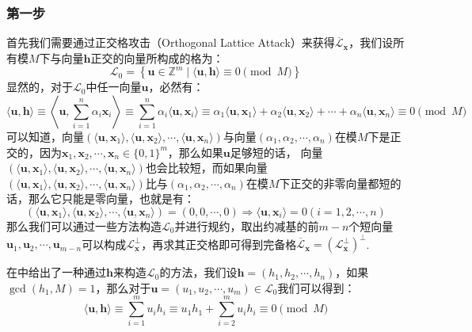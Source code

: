 \documentclass{book}
\numberwithin{equation}{subsubsection}
\begin{document}
\subsubsection*{第一步}
首先我们需要通过正交格攻击（Orthogonal Lattice Attack）来获得$\overline{\mathcal{L}}_{\pmb{x}}$，我们设所有模$M$下与向量$\pmb{h}$正交的向量所构成的格为：
\begin{equation}
    \mathcal{L}_0=\left\{\pmb{u}\in\mathbb{Z}^m\mid\langle\pmb{u},\pmb{h}\rangle\equiv0\pmod{M}\right\}
    \nonumber
\end{equation}
显然的，对于$\mathcal{L}_0$中任一向量$\pmb{u}$，必然有：
\begin{equation}
    \langle\pmb{u},\pmb{h}\rangle\equiv\left\langle\pmb{u},\sum_{i=1}^n\alpha_i\pmb{x}_i\right\rangle\equiv\sum_{i=1}^n\alpha_i\langle\pmb{u},\pmb{x}_i\rangle\equiv\alpha_1\langle\pmb{u},\pmb{x}_1\rangle+\alpha_2\langle\pmb{u},\pmb{x}_2\rangle+\cdots+\alpha_n\langle\pmb{u},\pmb{x}_n\rangle\equiv0\pmod{M}
    \nonumber
\end{equation}
可以知道，向量$(\langle\pmb{u},\pmb{x}_1\rangle,\langle\pmb{u},\pmb{x}_2\rangle,\cdots,\langle\pmb{u},\pmb{x}_n\rangle)$与向量$(\alpha_1,\alpha_2,\cdots,\alpha_n)$在模$M$下是正交的，因为$\pmb{x}_1,\pmb{x}_2,\cdots,\pmb{x}_n\in\{0,1\}^m$，那么如果$\pmb{u}$足够短的话，
向量$(\langle\pmb{u},\pmb{x}_1\rangle,\langle\pmb{u},\pmb{x}_2\rangle,\cdots,\langle\pmb{u},\pmb{x}_n\rangle)$也会比较短，而如果向量$(\langle\pmb{u},\pmb{x}_1\rangle,\langle\pmb{u},\pmb{x}_2\rangle,\cdots,\langle\pmb{u},\pmb{x}_n\rangle)$比与$(\alpha_1,\alpha_2,\cdots,\alpha_n)$在模$M$下正交的非零向量都短的话，那么它只能是零向量，也就是有：
\begin{equation}
    (\langle\pmb{u},\pmb{x}_1\rangle,\langle\pmb{u},\pmb{x}_2\rangle,\cdots,\langle\pmb{u},\pmb{x}_n\rangle)=(0,0,\cdots,0)\Rightarrow\langle\pmb{u},\pmb{x}_i\rangle=0(i=1,2,\cdots,n)
    \nonumber
\end{equation}
那么我们可以通过一些方法构造$\mathcal{L}_0$并进行规约，取出约减基的前$m-n$个短向量$\pmb{u}_1,\pmb{u}_2,\cdots,\pmb{u}_{m-n}$可以构成$\mathcal{L}_{\pmb{x}}^{\bot}$，再求其正交格即可得到完备格$\overline{\mathcal{L}}_{\pmb{x}}=(\mathcal{L}_{\pmb{x}}^{\bot})^{\bot}$.\par
在\cite{23}中给出了一种通过$\pmb{h}$来构造$\mathcal{L}_0$的方法，我们设$\pmb{h}=(h_1,h_2,\cdots,h_n)$，如果$\gcd(h_1,M)=1$，那么对于$\pmb{u}=(u_1,u_2,\cdots,u_m)\in\mathcal{L}_0$我们可以得到：
\begin{equation}
    \langle\pmb{u},\pmb{h}\rangle\equiv\sum_{i=1}^mu_ih_i\equiv u_1h_1+\sum_{i=2}^mu_ih_i\equiv0\pmod{M}
    \nonumber
\end{equation}
\end{document}
